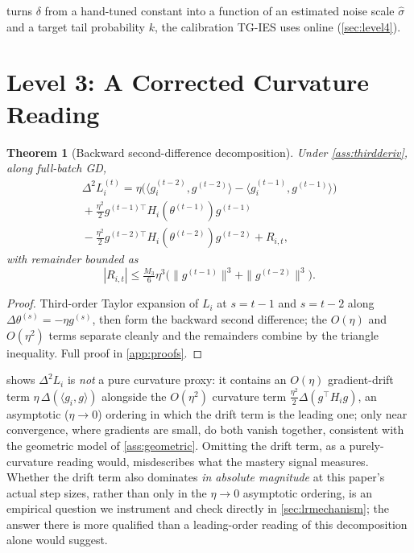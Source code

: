 \documentclass{article}
\theoremstyle{plain}
\newtheorem{theorem}{Theorem}[section]
\theoremstyle{definition}
\theoremstyle{remark}
\begin{document}
 turns $\delta$ from a hand-tuned constant into a function of an estimated noise scale $\hat\sigma$ and a target tail probability $k$, the calibration TG-IES uses online (\cref{sec:level4}).

\section{Level 3: A Corrected Curvature Reading}
\label{sec:level3}

\begin{theorem}[Backward second-difference decomposition]
\label{thm:curvature}
Under \cref{ass:thirdderiv}, along full-batch GD,
\begin{multline}
\label{eq:curvature}
\Delta^2 L_i^{(t)} = \eta\Big(\langle g_i^{(t-2)},g^{(t-2)}\rangle - \langle g_i^{(t-1)},g^{(t-1)}\rangle\Big) \\
{}+ \frac{\eta^2}{2}g^{(t-1)\top}H_i(\theta^{(t-1)})g^{(t-1)} \\
{}- \frac{\eta^2}{2}g^{(t-2)\top}H_i(\theta^{(t-2)})g^{(t-2)} + R_{i,t},
\end{multline}
with remainder bounded as
\begin{equation}
\label{eq:remainder-bound}
|R_{i,t}| \le \tfrac{M_3}{6}\eta^3\big(\|g^{(t-1)}\|^3+\|g^{(t-2)}\|^3\big).
\end{equation}
\end{theorem}
\begin{proof}
Third-order Taylor expansion of $L_i$ at $s=t-1$ and $s=t-2$ along $\Delta\theta^{(s)}=-\eta g^{(s)}$, then form the backward second difference; the $O(\eta)$ and $O(\eta^2)$ terms separate cleanly and the remainders combine by the triangle inequality. Full proof in \cref{app:proofs}.
\end{proof}

 shows $\Delta^2 L_i$ is \emph{not} a pure curvature proxy: it contains an $O(\eta)$ gradient-drift term $\eta\,\Delta(\langle g_i,g\rangle)$ alongside the $O(\eta^2)$ curvature term $\frac{\eta^2}2\Delta(g^\top H_i g)$, an asymptotic ($\eta\to0$) ordering in which the drift term is the leading one; only near convergence, where gradients are small, do both vanish together, consistent with the geometric model of \cref{ass:geometric}. Omitting the drift term, as a purely-curvature reading would, misdescribes what the mastery signal measures. Whether the drift term also dominates \emph{in absolute magnitude} at this paper's actual step sizes, rather than only in the $\eta\to0$ asymptotic ordering, is an empirical question we instrument and check directly in \cref{sec:lrmechanism}; the answer there is more qualified than a leading-order reading of this decomposition alone would suggest.
\end{document}
